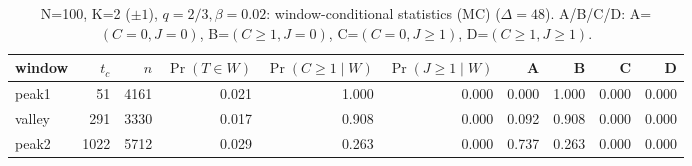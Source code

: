\begin{table}[!htbp]
\centering
\scriptsize
\setlength{\tabcolsep}{4pt}
\begin{tabular}{lrrrrrrrrr}
\toprule
window & $t_c$ & $n$ & $\Pr(T\in W)$ & $\Pr(C\ge 1\mid W)$ & $\Pr(J\ge 1\mid W)$ & A & B & C & D\\
\midrule
peak1 & 51 & 4161 & 0.021 & 1.000 & 0.000 & 0.000 & 1.000 & 0.000 & 0.000\\
valley & 291 & 3330 & 0.017 & 0.908 & 0.000 & 0.092 & 0.908 & 0.000 & 0.000\\
peak2 & 1022 & 5712 & 0.029 & 0.263 & 0.000 & 0.737 & 0.263 & 0.000 & 0.000\\
\bottomrule
\end{tabular}
\caption{N=100, K=2 ($\pm1$), $q=2/3,\beta=0.02$: window-conditional statistics (MC) ($\Delta=48$). A/B/C/D: A=$(C=0,J=0)$, B=$(C\ge 1,J=0)$, C=$(C=0,J\ge 1)$, D=$(C\ge 1,J\ge 1)$.}
\label{tab:case-window-N100-K2-beta002-en}
\end{table}
